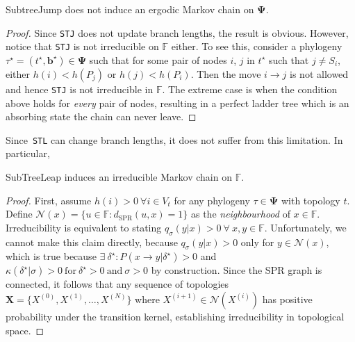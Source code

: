 \begin{remark}
\label{rmk:stj_ergodic}
 SubtreeJump does not induce an ergodic Markov chain on $\boldsymbol \Psi$.
 \end{remark}
\begin{proof}
 Since \verb|STJ| does not update branch lengths, the result is obvious.
 However, notice that \verb|STJ| is not irreducible on $\mathbb{F}$ either.
 To see this, consider a phylogeny $\tau^\star = (t^\star, \boldsymbol b^\star) \in \boldsymbol \Psi$ such that for some pair of nodes $i$, $j$  in $t^\star$ such that $j \neq S_i$, either $h(i) < h(P_j)$ or $h(j) < h(P_i)$.
 Then  the move $ i \to j$ is not allowed and hence \verb|STJ| is not irreducible in $\mathbb{F}$.
 The extreme case is when the condition above holds for \textit{every} pair of nodes, resulting in a perfect ladder tree which is an absorbing state the chain can never leave.
\end{proof}

Since~\verb|STL| can change branch lengths, it does not suffer from this limitation.
In particular,
\begin{remark}
\label{rmk:stl_irreducible_F}
 SubTreeLeap induces an irreducible Markov chain on $\mathbb{F}$.
 \end{remark}
\begin{proof}
First, assume $h(i) > 0 \: \forall i \in V_t$ for any phylogeny $\tau \in \boldsymbol \Psi$ with topology $t$.
 Define $\mathcal{N}(x) = \{ u \in \mathbb{F} : d_{\text{SPR}}(u, x) = 1 \}$ as the \textit{neighbourhood} of $x \in \mathbb{F}$.
 Irreducibility is equivalent to stating $q_\sigma(y | x) > 0 \: \forall \: x, y \in \mathbb{F}$.
 Unfortunately, we cannot make this claim directly, because $q_\sigma(y | x) > 0$ only for $y \in \mathcal{N}(x)$, which is true because $\exists \: \delta^\star : P(x \rightarrow y | \delta^\star) > 0 $ and $\kappa(\delta^\star | \sigma) > 0 \: \text{for} \: \delta^\star > 0 \: \text{and} \: \sigma > 0$ by construction.
 Since the SPR graph is connected, it follows that any sequence of topologies $\boldsymbol X = \{ X^{(0)}, X^{(1)}, \ldots, X^{(N)}\}$ where $X^{(i + 1)} \in \mathcal{N}( X^{(i)})$ has positive probability under the transition kernel, establishing irreducibility in topological space.
\end{proof}

